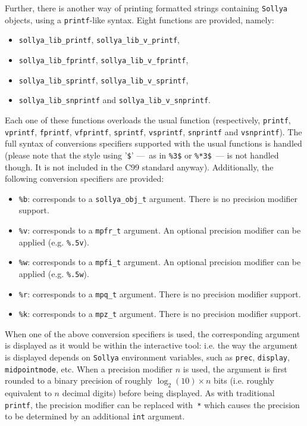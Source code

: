 \documentclass[a4paper]{article}
\newcommand{\sollya}{\texttt{Sollya}\xspace}
\begin{document}
Further, there is another way of printing formatted strings containing \sollya objects, using a {\tt printf}-like syntax. Eight functions are provided, namely:
\begin{itemize}
\item \verb|sollya_lib_printf|, \verb|sollya_lib_v_printf|,
\item \verb|sollya_lib_fprintf|, \verb|sollya_lib_v_fprintf|,
\item \verb|sollya_lib_sprintf|, \verb|sollya_lib_v_sprintf|,
\item \verb|sollya_lib_snprintf| and \verb|sollya_lib_v_snprintf|.
\end{itemize}
Each one of these functions overloads the usual function (respectively, \verb|printf|, \verb|vprintf|, \verb|fprintf|, \verb|vfprintf|, \verb|sprintf|, \verb|vsprintf|, \verb|snprintf| and \verb|vsnprintf|). The full syntax of conversions specifiers supported with the usual functions is handled (please note that the style using '\verb|$|' ---~as in \verb|%3$| or \verb|%*3$|~--- is not handled though. It is not included in the C99 standard anyway). Additionally, the following conversion specifiers are provided:
\begin{itemize}
\item \verb|%b|: corresponds to a \verb|sollya_obj_t| argument. There is no precision modifier support.
\item \verb|%v|: corresponds to a \verb|mpfr_t| argument. An optional precision modifier can be applied (e.g. \verb|%.5v|).
\item \verb|%w|: corresponds to a \verb|mpfi_t| argument. An optional precision modifier can be applied (e.g. \verb|%.5w|).
\item \verb|%r|: corresponds to a \verb|mpq_t| argument. There is no precision modifier support.
\item \verb|%k|: corresponds to a \verb|mpz_t| argument. There is no precision modifier support.
\end{itemize}
When one of the above conversion specifiers is used, the corresponding argument is displayed as it would be within the interactive tool: i.e. the way the argument is displayed depends on \sollya environment variables, such as \verb|prec|, \verb|display|, \verb|midpointmode|, etc. When a precision modifier $n$ is used, the argument is first rounded to a binary precision of roughly $\log_2(10)\times n$ bits (i.e. roughly equivalent to $n$ decimal digits) before being displayed. As with traditional \verb|printf|, the precision modifier can be replaced with~\verb|*| which causes the precision to be determined by an additional \verb|int| argument.
\end{document}
